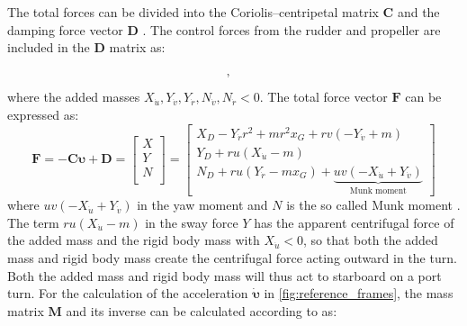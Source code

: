 The total forces can be divided into the Coriolis–centripetal matrix $\mathbf{C}$ and the damping force vector $\mathbf{D}$ \citep{fossenHandbookMarineCraft2011}. The control forces from the rudder and propeller are included in the $\mathbf{D}$ matrix as:
\begin{equation}
    \label{eq:C_expanded}
    , \hspace{0.3cm}
    
\end{equation}
where the added masses $X_{\dot{u}},Y_{\dot{v}},Y_{\dot{r}},N_{\dot{v}},N_{\dot{r}} < 0$. The total force vector $\mathbf{F}$ can be expressed as:
\begin{equation}
    \label{eq:F_expanded}
\mathbf{F} = - \mathbf{C} \pmb{\upsilon} + \mathbf{D} =
\left[\begin{matrix}
X \\
Y \\
N \\
\end{matrix}\right]
=
\left[\begin{matrix}X_{D} - Y_{\dot{r}} r^{2} + m r^{2} x_{G} + r v \left(- Y_{\dot{v}} + m\right)\\Y_{D} + r u \left(X_{\dot{u}} - m\right)\\N_{D} + r u \left(Y_{\dot{r}} - m x_{G}\right) + \underbrace{u v \left(- X_{\dot{u}} + Y_{\dot{v}}\right)}_{\text{Munk moment}} \end{matrix}\right]
\end{equation}
where $u v \left(- X_{\dot{u}} + Y_{\dot{v}}\right)$ in the yaw moment and $N$ is the so called Munk moment \citep{fossenHandbookMarineCraft2011}. The term $r u \left(X_{\dot{u}} - m\right)$ in the sway force $Y$ has the apparent centrifugal force of the added mass and the rigid body mass with $X_{\dot{u}}<0$, so that both the added mass and rigid body mass create the centrifugal force acting outward in the turn. Both the added mass and rigid body mass will thus act to starboard on a port turn.
For the calculation of the acceleration $\pmb{\dot{\upsilon}}$ in \autoref{fig:reference_frames}, the mass matrix $\mathbf{M}$ and its inverse can be calculated according to \citet{fossenHandbookMarineCraft2011} as: 
